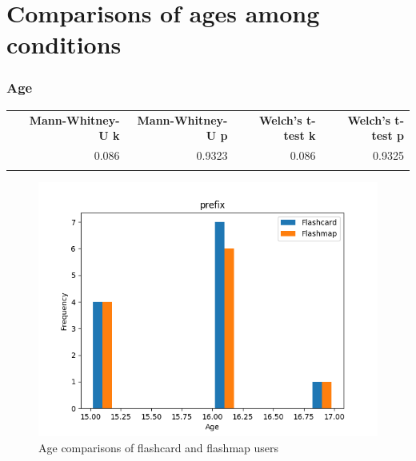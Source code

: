 \FloatBarrier
\section{Comparisons of ages among conditions}

\FloatBarrier
\subsubsection{Age}

\begin{longtable}[c]{@{}lrrrr@{}}
\toprule\addlinespace
& \textbf{Mann-Whitney-U k} & \textbf{Mann-Whitney-U p} &
\textbf{Welch's t-test k} & \textbf{Welch's t-test p}
\\\addlinespace
\midrule\endhead
& 0.086 & 0.9323 & 0.086 & 0.9325
\\\addlinespace
\bottomrule
    \label{tab:age_comp}
\end{longtable}

\begin{figure}[htbp]
    \centering
    \includegraphics[width=.7\textwidth]{img/age.png}
    \caption{Age comparisons of flashcard and flashmap users}
    \label{fig:age}
\end{figure}
